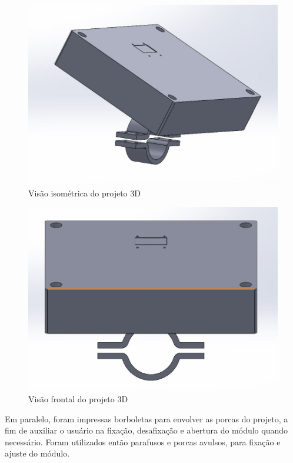 \begin{figure}[!h]
\centering
\includegraphics[width=13cm]{capitulos/Figuras/3d-1.jpg}
\caption{Visão isométrica do projeto 3D}
\label{fig:3d1}
\end{figure}

\begin{figure}[!h]
\centering
\includegraphics[width=13cm]{capitulos/Figuras/3d-2.jpg}
\caption{Visão frontal do projeto 3D}
\label{fig:3d2}
\end{figure}

\newpage
Em paralelo, foram impressas borboletas para envolver as porcas do projeto, a fim de auxiliar o usuário na fixação, desafixação e abertura do módulo quando necessário. Foram utilizados então parafusos e porcas avulsos, para fixação e ajuste do módulo.

